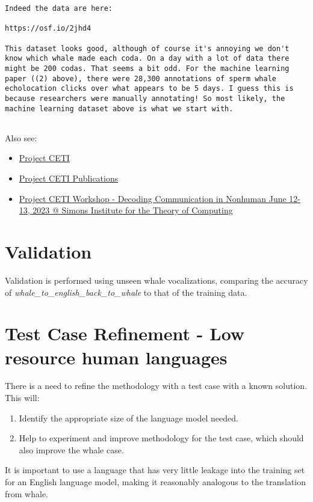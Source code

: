 \documentclass{article}
\begin{document}
\begin{lstlisting}[breaklines=true, breakatwhitespace=true, columns=flexible, basicstyle=\ttfamily\small]
Indeed the data are here:

https://osf.io/2jhd4

This dataset looks good, although of course it's annoying we don't know which whale made each coda. On a day with a lot of data there might be 200 codas. That seems a bit odd. For the machine learning paper ((2) above), there were 28,300 annotations of sperm whale echolocation clicks over what appears to be 5 days. I guess this is because researchers were manually annotating! So most likely, the machine learning dataset above is what we start with.


\end{lstlisting}

Also see:
\begin{itemize}
    \item \href{https://www.projectceti.org/}{Project CETI}
    \item \href{https://www.projectceti.org/news-research-insights#publications}{Project CETI Publications}
    \item \href{https://www.youtube.com/playlist?list=PL-7Ju3RM0_oUKDIfBWlsOhONsXimWfMlF}{Project CETI Workshop - Decoding Communication in Nonhuman June 12-13, 2023 @ Simons Institute for the Theory of Computing}
\end{itemize}


\section{Validation}
Validation is performed using unseen whale vocalizations, comparing the accuracy of \textit{whale\_to\_english\_back\_to\_whale} to that of the training data.
\section{Test Case Refinement - Low resource human languages}
There is a need to refine the methodology with a test case with a known solution. This will:
\begin{enumerate}
    \item Identify the appropriate size of the language model needed.
    \item Help to experiment and improve methodology for the test case, which should also improve the whale case.
\end{enumerate}

It is important to use a language that has very little leakage into the training set for an English language model, making it reasonably analogous to the translation from whale.
\end{document}
